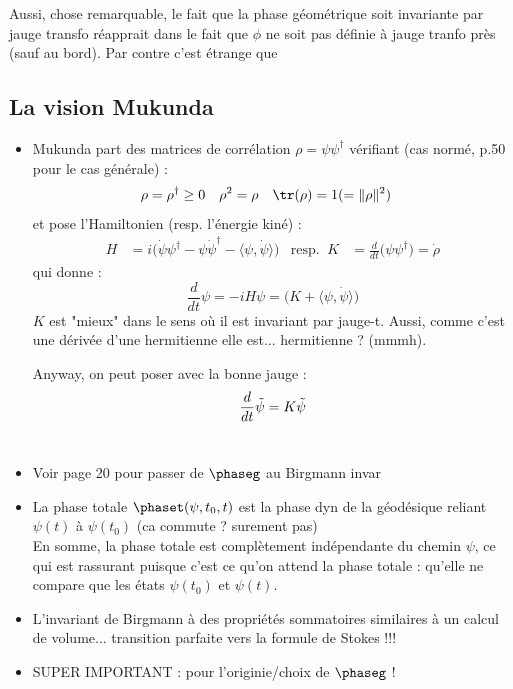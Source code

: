 Aussi, chose remarquable, le fait que la phase géométrique soit invariante par jauge transfo réapprait dans le fait que $\phi$ ne soit pas définie à jauge tranfo près (sauf au bord). Par contre c'est étrange que 



\subsection{La vision Mukunda \cite{mukunda_quantum_1993,mukunda_quantum_1993-1}}

\begin{itemize}
	\item Mukunda \cite[p. 10]{mukunda_quantum_1993} part des matrices de corrélation $\rho = \psi\psi^\dagger$ vérifiant (cas normé, p.50 pour le cas générale) :
	\begin{align*}
		\rho &= \rho^\dagger \geq 0  &  \rho^2 &= \rho  &  \tr(\rho) &= 1 (=\|\rho\|^2)
	\end{align*}
	et pose l'Hamiltonien  (resp. l'énergie kiné) :
	\begin{align*}
		H &= i\big( \dot{\psi} \psi^\dagger - \psi\dot{\psi}^\dagger - \langle \psi, \dot{\psi}\rangle\big)  &  \text{resp. }\ K &= \frac{d}{dt}\big( \psi\psi^\dagger \big) = \dot{\rho}
	\end{align*}
	qui donne :
	\[\frac{d}{dt}\psi = -i H\psi = \big( K + \langle\psi, \dot{\psi}\rangle \big)\]
	$K$ est "mieux" dans le sens où il est invariant par jauge-t. Aussi, comme c'est une dérivée d'une hermitienne elle est... hermitienne ? (mmmh).
	
	Anyway, on peut poser avec la bonne jauge :
	\[\frac{d}{dt}\Tilde{\psi} = K\Tilde{\psi}\]
	\\
	
	\item Voir page 20 pour passer de $\phaseg$ au Birgmann invar
	\\
	
	\item La phase totale $\phaset(\psi,t_0,t)$ est la phase dyn de la géodésique reliant $\psi(t)$ à $\psi(t_0)$ (ca commute ? surement pas)
	\\
	En somme, la phase totale est complètement indépendante du chemin $\psi$, ce qui est rassurant puisque c'est ce qu'on attend la phase totale : qu'elle ne compare que les états $\psi(t_0)$ et $\psi(t)$.
	
	\item L'invariant de Birgmann à des propriétés sommatoires similaires à un calcul de volume... transition parfaite vers la formule de Stokes !!!
	
	\item SUPER IMPORTANT : \cite[(8.6),p.51]{mukunda_quantum_1993} pour l'originie/choix de $\phaseg$ !
\end{itemize}








